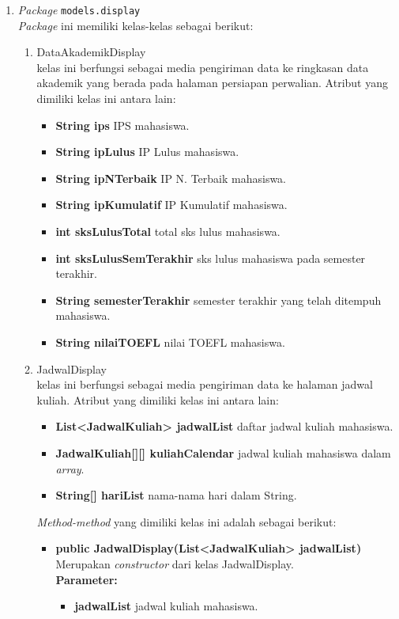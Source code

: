 \begin{enumerate}
	\item \textit{Package} \texttt{models.display}\\
	\textit{Package} ini memiliki kelas-kelas sebagai berikut:
	\begin{enumerate}
		\item DataAkademikDisplay\\
		kelas ini berfungsi sebagai media pengiriman data ke ringkasan data akademik yang berada pada halaman persiapan perwalian. Atribut yang dimiliki kelas ini antara lain:
		\begin{itemize}
			\item \textbf{String ips} IPS mahasiswa.
			\item \textbf{String ipLulus} IP Lulus mahasiswa.
			\item \textbf{String ipNTerbaik} IP N. Terbaik mahasiswa.
			\item \textbf{String ipKumulatif} IP Kumulatif mahasiswa.
			\item \textbf{int sksLulusTotal} total sks lulus mahasiswa.
			\item \textbf{int sksLulusSemTerakhir} sks lulus mahasiswa pada semester terakhir.
			\item \textbf{String semesterTerakhir} semester terakhir yang telah ditempuh mahasiswa.
			\item \textbf{String nilaiTOEFL} nilai TOEFL mahasiswa.
		\end{itemize}
		\item JadwalDisplay\\
		kelas ini berfungsi sebagai media pengiriman data ke halaman jadwal kuliah. Atribut yang dimiliki kelas ini antara lain:
		\begin{itemize}
			\item \textbf{List<JadwalKuliah> jadwalList} daftar jadwal kuliah mahasiswa. 
			\item \textbf{JadwalKuliah[][] kuliahCalendar} jadwal kuliah mahasiswa dalam \textit{array}.
			\item \textbf{String[] hariList} nama-nama hari dalam String.
		\end{itemize}
		\textit{Method-method} yang dimiliki kelas ini adalah sebagai berikut:
		\begin{itemize}
			\item \textbf{public JadwalDisplay(List<JadwalKuliah> jadwalList)}\\
			Merupakan \textit{constructor} dari kelas JadwalDisplay.\\
			\textbf{Parameter:}
			\begin{itemize}
				\item \textbf{jadwalList} jadwal kuliah mahasiswa.
			\end{itemize}
			

\end{itemize}
\end{enumerate}
\end{enumerate}
